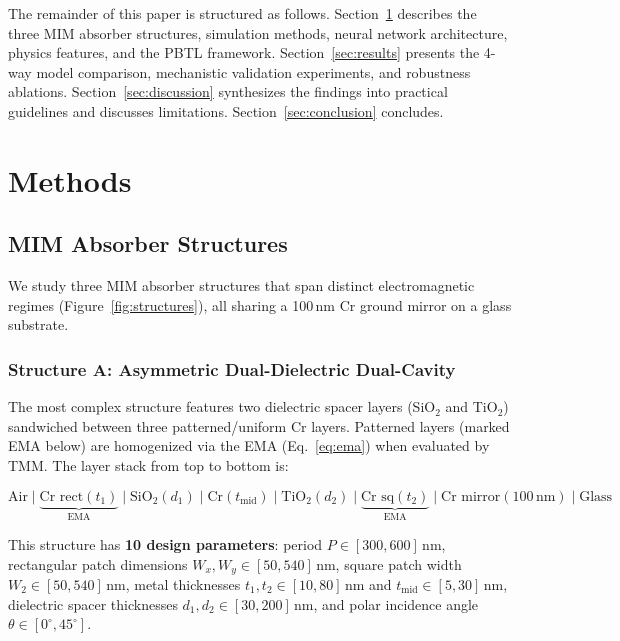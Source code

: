 \documentclass[a4paper,fleqn]{cas-sc}
\begin{document}
The remainder of this paper is structured as follows. Section~\ref{sec:methods} describes the three MIM absorber structures, simulation methods, neural network architecture, physics features, and the PBTL framework. Section~\ref{sec:results} presents the 4-way model comparison, mechanistic validation experiments, and robustness ablations. Section~\ref{sec:discussion} synthesizes the findings into practical guidelines and discusses limitations. Section~\ref{sec:conclusion} concludes.

\section{Methods}
\label{sec:methods}

\subsection{MIM Absorber Structures}
\label{sec:structures}

We study three MIM absorber structures that span distinct electromagnetic regimes (Figure~\ref{fig:structures}), all sharing a 100\,nm Cr ground mirror on a glass substrate.

\subsubsection{Structure A: Asymmetric Dual-Dielectric Dual-Cavity}

The most complex structure features two dielectric spacer layers (SiO$_2$ and TiO$_2$) sandwiched between three patterned/uniform Cr layers. Patterned layers (marked EMA below) are homogenized via the EMA (Eq.~\ref{eq:ema}) when evaluated by TMM. The layer stack from top to bottom is:

\begin{equation}
\text{Air} \mid \underbrace{\text{Cr rect}(t_1)}_{\text{EMA}} \mid \text{SiO}_2(d_1) \mid \text{Cr}(t_\text{mid}) \mid \text{TiO}_2(d_2) \mid \underbrace{\text{Cr sq}(t_2)}_{\text{EMA}} \mid \text{Cr mirror}(100\,\text{nm}) \mid \text{Glass}
\end{equation}

This structure has \textbf{10 design parameters}: period $P \in [300, 600]$\,nm, rectangular patch dimensions $W_x, W_y \in [50, 540]$\,nm, square patch width $W_2 \in [50, 540]$\,nm, metal thicknesses $t_1, t_2 \in [10, 80]$\,nm and $t_\text{mid} \in [5, 30]$\,nm, dielectric spacer thicknesses $d_1, d_2 \in [30, 200]$\,nm, and polar incidence angle $\theta \in [0^\circ, 45^\circ]$.
\end{document}
